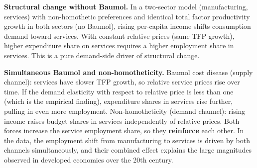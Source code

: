 \documentclass[a4paper,11pt]{article}
\begin{document}
\begin{enumerate}[label=\textbf{SQ\arabic*.},leftmargin=*]
\begin{answerbox}
\textbf{Structural change without Baumol.} In a two-sector model (manufacturing, services) with non-homothetic preferences and identical total factor productivity growth in both sectors (no Baumol), rising per-capita income shifts consumption demand toward services. With constant relative prices (same TFP growth), higher expenditure share on services requires a higher employment share in services. This is a pure demand-side driver of structural change.

\textbf{Simultaneous Baumol and non-homotheticity.} Baumol cost disease (supply channel): services have slower TFP growth, so relative service prices rise over time. If the demand elasticity with respect to relative price is less than one (which is the empirical finding), expenditure shares in services rise further, pulling in even more employment. Non-homotheticity (demand channel): rising income raises budget shares in services independently of relative prices. Both forces increase the service employment share, so they \textbf{reinforce} each other. In the data, the employment shift from manufacturing to services is driven by both channels simultaneously, and their combined effect explains the large magnitudes observed in developed economies over the 20th century.
\end{answerbox}

\end{enumerate}
\end{document}
